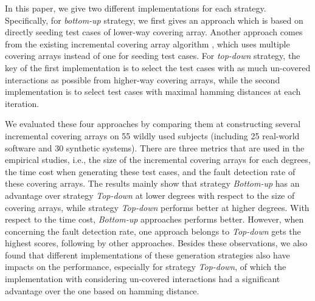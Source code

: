 \documentclass[conference]{IEEEtran}
\theoremstyle{definition}
\begin{document}
In this paper, we give two different implementations for each strategy. Specifically, for \emph{bottom-up} strategy, we first gives an approach which is based on directly seeding test cases of lower-way covering array. Another approach comes from the existing incremental covering array algorithm \cite{fouche2009incremental}, which uses multiple covering arrays instead of one for seeding test cases. For \emph{top-down} strategy, the key of the first implementation is to select the test cases with as much un-covered interactions as possible from higher-way covering arrays, while the second implementation is to select test cases with maximal hamming distances at each iteration.

We evaluated these four approaches by comparing them at constructing several incremental covering arrays on 55 wildly used subjects (including 25 real-world software and 30 synthetic systems). There are three metrics that are used in the empirical studies, i.e., the size of the incremental covering arrays for each degrees, the time cost when generating these test cases, and the fault detection rate of these covering arrays. The results mainly show that strategy \emph{Bottom-up} has an advantage over strategy \emph{Top-down} at lower degrees with respect to the size of covering arrays, while strategy \emph{Top-down} performs better at higher degrees. With respect to the time cost, \emph{Bottom-up} approaches performs better. However, when concerning the fault detection rate, one approach belongs to \emph{Top-down} gets the highest scores, following by other approaches.  Besides these observations, we also found that different implementations of these generation strategies also have impacts on the performance, especially for strategy \emph{Top-down}, of which the implementation with considering un-covered interactions had a significant advantage over the one based on hamming distance.


%
\end{document}
